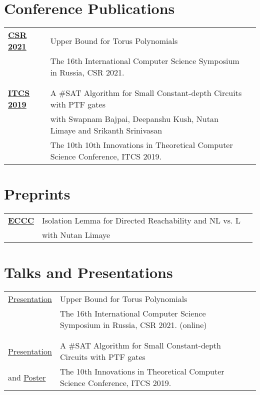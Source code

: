 \documentclass[a4paper,10pt]{article}
\begin{document}
\section{Conference Publications}

\begin{tabular}{p{2.5cm}|p{11cm}l}
  \href{https://link.springer.com/chapter/10.1007/978-3-030-79416-3_15}{{\bf CSR 2021}} & Upper Bound for Torus Polynomials \\
  & The 16th International Computer Science Symposium in Russia, CSR 2021. \\\multicolumn{2}{c}{} \\
  \\
  \href{https://drops.dagstuhl.de/opus/volltexte/2018/10101/}{{\bf ITCS 2019}} & A \#SAT Algorithm for Small Constant-depth Circuits with PTF gates \\
  & with Swapnam Bajpai, Deepanshu Kush, Nutan Limaye and Srikanth Srinivasan \\
  & The 10th 10th Innovations in Theoretical Computer Science Conference, ITCS 2019.
\end{tabular}

\section{Preprints}

\begin{tabular}{p{2.5cm}|p{11cm}l}
  \href{https://eccc.weizmann.ac.il/report/2016/155/}{{\bf ECCC}} & Isolation Lemma for Directed Reachability and NL vs. L
  \\
  & with Nutan Limaye
\end{tabular}

\section{Talks and Presentations}

\begin{tabular}{p{2.5cm}|p{11cm}l}
  \href{https://vaibhkrishan.github.io/files/slides/torus.pdf}{Presentation} & Upper Bound for Torus Polynomials \\
  & The 16th International Computer Science Symposium in Russia, CSR 2021. (online) \\\multicolumn{2}{c}{} \\
  \\
  \href{https://vaibhkrishan.github.io/files/slides/ptf.pdf}{Presentation} & A \#SAT Algorithm for Small Constant-depth Circuits with PTF gates \\
  and \href{https://vaibhkrishan.github.io/files/slides/poster.pdf}{Poster} & The 10th Innovations in Theoretical Computer Science Conference, ITCS 2019.
\end{tabular}
\end{document}
